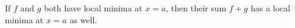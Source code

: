 \documentclass{ximera}
\author{Steven Gubkin}
\begin{document}
\begin{exercise}

	If $f$ and $g$ both have local minima at $x=a$, then their sum $f+g$ has a local minima at $x=a$ as well.
	\begin{multipleChoice}	
	\end{multipleChoice}

\end{exercise}
\end{document}

